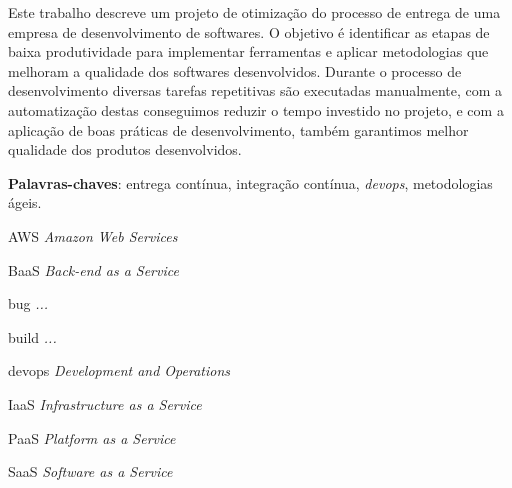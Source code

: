\documentclass[
	12pt,				%
	openright,			%
	twoside,			%
	a4paper,			%
	english,			%
	french,				%
	spanish,			%
	brazil,				%
	]{abntex2}
\begin{document}

\frenchspacing 


\imprimircapa

\imprimirfolhaderosto*



\setlength{\absparsep}{18pt} %
\begin{resumo}
 Este trabalho descreve um projeto de otimização do processo de entrega de uma empresa de desenvolvimento de softwares. O objetivo é identificar as etapas de baixa produtividade para implementar ferramentas e aplicar metodologias que melhoram a qualidade dos softwares desenvolvidos. Durante o processo de desenvolvimento diversas tarefas repetitivas são executadas manualmente, com a automatização destas conseguimos reduzir o tempo investido no projeto, e com a aplicação de boas práticas de desenvolvimento, também garantimos melhor qualidade dos produtos desenvolvidos.

 \noindent
 \textbf{Palavras-chaves}: entrega contínua, integração contínua, \textit{devops}, metodologias ágeis.
\end{resumo}


\listoftables*

\begin{siglas}
	\item[AWS] \textit{Amazon Web Services}
	\item[BaaS] \textit{Back-end as a Service}
	\item[bug] \textit{...}
	\item[build] \textit{...}
	\item[devops] \textit{Development and Operations}
	\item[IaaS] \textit{Infrastructure as a Service}
	\item[PaaS] \textit{Platform as a Service}
	\item[SaaS] \textit{Software as a Service}
\end{siglas}
\end{document}
